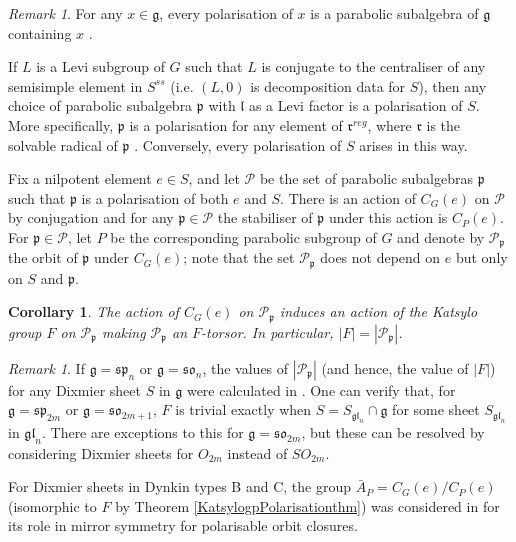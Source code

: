 \documentclass{amsart}
\newtheorem{corollary}[theorem]{Corollary}
\theoremstyle{remark}
\newtheorem{remark}[theorem]{Remark}
\numberwithin{theorem}{section}
\numberwithin{equation}{section}
\begin{document}
\begin{remark}\label{Polarisationrmk}
    For any $x \in \mathfrak{g}$, every polarisation of $x$ is a parabolic subalgebra of $\mathfrak{g}$ containing $x$ \cite[Theorem 2.2]{OW}.

    If $L$ is a Levi subgroup of $G$ such that $L$ is conjugate to the centraliser of any semisimple element in $S^{ss}$ (i.e. $(L,0)$ is decomposition data for $S$), then any choice of parabolic subalgebra $\mathfrak{p}$ with $\mathfrak{l}$ as a Levi factor is a polarisation of $S$. More specifically, $\mathfrak{p}$ is a polarisation for any element of $\mathfrak{r}^{reg}$, where $\mathfrak{r}$ is the solvable radical of $\mathfrak{p}$ \cite[Lemma 6.5]{Borho1}. Conversely, every polarisation of $S$ arises in this way.
\end{remark}  

Fix a nilpotent element $e \in S$, and let $\mathscr P$ be the set of parabolic subalgebras $\mathfrak{p}$ such that $\mathfrak{p}$ is a polarisation of both $e$ and $S$. There is an action of $C_G(e)$ on $\mathscr P$ by conjugation and for any $\mathfrak{p} \in \mathscr P$ the stabiliser of $\mathfrak{p}$ under this action is $C_P(e)$. For $\mathfrak{p} \in \mathscr P$, let $P$ be the corresponding parabolic subgroup of $G$ and denote by $\mathscr P_{\mathfrak{p}}$ the orbit of $\mathfrak{p}$ under $C_G(e)$; note that the set $\mathscr P_{\mathfrak{p}}$ does not depend on $e$ but only on $S$ and $\mathfrak{p}$.

\begin{corollary}\label{Polarisationcor}
    The action of $C_G(e)$ on $\mathscr P_\mathfrak{p}$ induces an action of the Katsylo group $F$ on $\mathscr P_{\mathfrak{p}}$ making $\mathscr P_{\mathfrak{p}}$ an $F$-torsor. In particular, $|F| = |\mathscr P_{\mathfrak{p}}|$.
\end{corollary}

\begin{remark}\label{ClassicalPolrmk}
    If $\mathfrak{g} = \mathfrak{sp}_n$ or $\mathfrak{g}=\mathfrak{so}_n$, the values of $|\mathscr P_{\mathfrak{p}}|$ (and hence, the value of $|F|$) for any Dixmier sheet $S$ in $\mathfrak{g}$ were calculated in \cite{Hesselink}. One can verify that, for $\mathfrak{g}= \mathfrak{sp}_{2m}$ or $\mathfrak{g} = \mathfrak{so}_{2m+1}$, $F$ is trivial exactly when $S = S_{\mathfrak{gl}_n} \cap \mathfrak{g}$ for some sheet $S_{\mathfrak{gl}_n}$ in $\mathfrak{gl}_n$. There are exceptions to this for $\mathfrak{g}=\mathfrak{so}_{2m}$, but these can be resolved by considering Dixmier sheets for $O_{2m}$ instead of $SO_{2m}$.

    For Dixmier sheets in Dynkin types B and C, the group $\bar{A}_P = C_G(e)/C_P(e)$ (isomorphic to $F$ by Theorem \ref{KatsylogpPolarisationthm}) was considered in \cite{FRW} for its role in mirror symmetry for polarisable orbit closures.
\end{remark}
\end{document}
